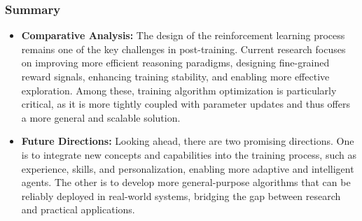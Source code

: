 \subsubsection{Summary}
\begin{tcolorbox}[takeaway,title={Takeaway 6.4}] %
\begin{itemize}
\item \textbf{Comparative Analysis:}  The design of the reinforcement learning process remains one of the key challenges in post-training. Current research focuses on improving more efficient reasoning paradigms, designing fine-grained reward signals, enhancing training stability, and enabling more effective exploration. Among these, training algorithm optimization is particularly critical, as it is more tightly coupled with parameter updates and thus offers a more general and scalable solution.

\item \textbf{Future Directions:} Looking ahead, there are two promising directions. One is to integrate new concepts and capabilities into the training process, such as experience, skills, and personalization, enabling more adaptive and intelligent agents. The other is to develop more general-purpose algorithms that can be reliably deployed in real-world systems, bridging the gap between research and practical applications.
\end{itemize}
\end{tcolorbox}













